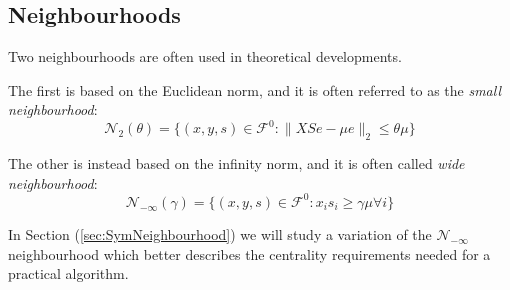 %
%
\subsection{Neighbourhoods}

Two neighbourhoods are often used in theoretical developments.

The first is based on the Euclidean norm, and it is often referred
to as the {\em small neighbourhood}:
\[
\mathcal{N}_2(\theta) = \{ (x,y,s) \in \mathcal{F}^0 :
                         \| XSe - \mu e \|_2 \le \theta\mu \}
\]

The other is instead based on the infinity norm, and it is often
called {\em wide neighbourhood}:
\[
\mathcal{N}_{-\infty}(\gamma) = \{ (x,y,s) \in \mathcal{F}^0 :
                         x_is_i \ge \gamma\mu \forall i \}
\]

In Section (\ref{sec:SymNeighbourhood}) we will study a variation
of the $\mathcal{N}_{-\infty}$ neighbourhood which better describes
the centrality requirements needed for a practical algorithm.
